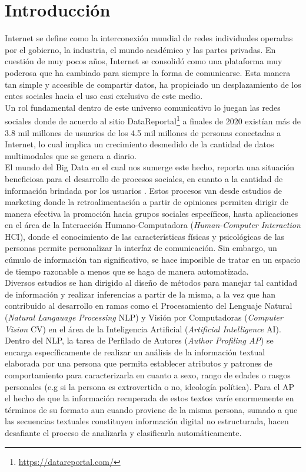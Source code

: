 \chapter*{Introducción}
Internet se define como la interconexión mundial de redes individuales operadas por el gobierno, la industria, el mundo académico y las partes privadas. En cuestión de muy pocos años, Internet se consolidó como una plataforma muy poderosa que ha cambiado para siempre la forma de comunicarse.  Esta manera tan simple y accesible de compartir datos, ha propiciado un desplazamiento de los entes sociales hacia el uso casi exclusivo de este medio.
\\
Un rol fundamental dentro de este universo comunicativo lo juegan las redes sociales donde de acuerdo al sitio DataReportal\footnote{\url{https://datareportal.com/}} a finales de 2020 existían más de 3.8 mil millones de usuarios de los 4.5 mil millones de personas conectadas a Internet, lo cual implica un crecimiento desmedido de la cantidad de datos multimodales que se genera a diario.
\\
El mundo del Big Data \citep{Riahi2018BigDA} en el cual nos sumerge este hecho, reporta una situación beneficiosa para el desarrollo de procesos sociales, en cuanto a la cantidad de información brindada por los usuarios . 
Estos procesos van desde estudios de marketing donde la retroalimentación a partir de opiniones permiten dirigir de manera efectiva la promoción hacia grupos sociales específicos, hasta aplicaciones en el área de la Interacción Humano-Computadora (\textit{Human-Computer Interaction }HCI), donde el conocimiento de las características físicas y psicológicas de las personas permite personalizar la interfaz de comunicación. Sin embargo, un cúmulo de información tan significativo, se hace imposible de tratar en un espacio de tiempo razonable a menos que se haga de manera automatizada.
\\
Diversos estudios se han dirigido al diseño de métodos para manejar tal cantidad de información y realizar inferencias a partir de la misma, a la vez que han contribuido al desarrollo en ramas como el Procesamiento del Lenguaje Natural (\textit{Natural Langauage Processing} NLP) y Visión por Computadoras (\textit{Computer Vision} CV) en el área de la Inteligencia Artificial (\textit{Artificial Intelligence} AI).
\\ 
Dentro del NLP, la tarea de Perfilado de Autores (\textit{Author Profiling AP}) \citep{Rosso2019,article} se encarga específicamente de realizar un análisis de la información textual elaborada por una persona que permita establecer atributos y patrones de comportamiento para caracterizarla en cuanto a sexo, rango de edades o rasgos personales (e.g si la persona es extrovertida o no, ideología política). Para el AP el hecho de que la información recuperada de estos textos varíe enormemente en términos de su formato aun cuando proviene de la misma persona, sumado a que las secuencias textuales constituyen información digital no estructurada, hacen desafiante el proceso de analizarla y clasificarla automáticamente. 
